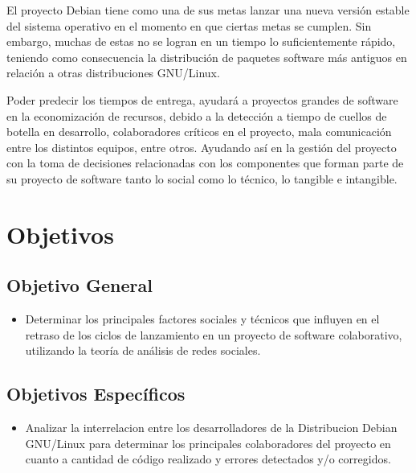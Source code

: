 \documentclass[12pt]{report}
\begin{document}
El  proyecto Debian  tiene  como una  de sus  metas  lanzar una  nueva
versión estable  del sistema  operativo en el  momento en  que ciertas
metas se  cumplen.  Sin embargo,  muchas de estas  no se logran  en un
tiempo  lo  suficientemente  rápido,  teniendo  como  consecuencia  la
distribución de  paquetes software  más antiguos  en relación  a otras
distribuciones GNU/Linux.

Poder predecir los tiempos de  entrega, ayudará a proyectos grandes de
software  en la  economización de  recursos, debido  a la  detección a
tiempo de cuellos de botella  en desarrollo, colaboradores críticos en
el  proyecto, mala  comunicación  entre los  distintos equipos,  entre
otros.   Ayudando así  en  la  gestión del  proyecto  con  la toma  de
decisiones relacionadas  con los  componentes que  forman parte  de su
proyecto de  software tanto lo social  como lo técnico, lo  tangible e
intangible.

\section*{Objetivos}  %
\subsection{Objetivo General}
\begin{itemize}
\item Determinar los principales factores sociales y técnicos que influyen 
en el retraso de los ciclos de lanzamiento en un proyecto de software
colaborativo, utilizando la teoría de análisis de redes sociales.
\end{itemize}

\subsection{Objetivos Específicos}
\begin{itemize}
\item Analizar la interrelacion entre los desarrolladores de la Distribucion
Debian  GNU/Linux para  determinar los  principales colaboradores  del
proyecto en cuanto a cantidad de código realizado y errores detectados
y/o corregidos.

\end{itemize}

\end{document}
